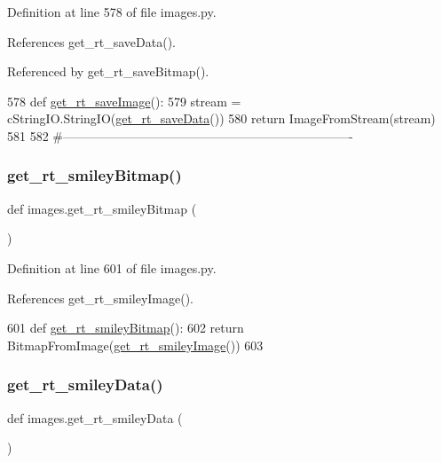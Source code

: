 Definition at line 578 of file images.\+py.



References get\+\_\+rt\+\_\+save\+Data().



Referenced by get\+\_\+rt\+\_\+save\+Bitmap().


\begin{DoxyCode}
578 \textcolor{keyword}{def }\hyperlink{namespaceimages_ac74de0ec00f14235b98b1398783e6f5f}{get\_rt\_saveImage}():
579     stream = cStringIO.StringIO(\hyperlink{namespaceimages_ab57eaafe3165ec3e04e68b392b4e32af}{get\_rt\_saveData}())
580     \textcolor{keywordflow}{return} ImageFromStream(stream)
581 
582 \textcolor{comment}{#----------------------------------------------------------------------}
\end{DoxyCode}
\mbox{\label{namespaceimages_ac352cdc1b61543c7ee9b2b9b8819c34c}} 
\subsubsection{\texorpdfstring{get\+\_\+rt\+\_\+smiley\+Bitmap()}{get\_rt\_smileyBitmap()}}
{\footnotesize\ttfamily def images.\+get\+\_\+rt\+\_\+smiley\+Bitmap (\begin{DoxyParamCaption}{ }\end{DoxyParamCaption})}



Definition at line 601 of file images.\+py.



References get\+\_\+rt\+\_\+smiley\+Image().


\begin{DoxyCode}
601 \textcolor{keyword}{def }\hyperlink{namespaceimages_ac352cdc1b61543c7ee9b2b9b8819c34c}{get\_rt\_smileyBitmap}():
602     \textcolor{keywordflow}{return} BitmapFromImage(\hyperlink{namespaceimages_a80f5f18c45716de64354e8a3cd06e245}{get\_rt\_smileyImage}())
603 
\end{DoxyCode}
\mbox{\label{namespaceimages_ab452e2b655beaf7b1c1f5d07e28913ad}} 
\subsubsection{\texorpdfstring{get\+\_\+rt\+\_\+smiley\+Data()}{get\_rt\_smileyData()}}
{\footnotesize\ttfamily def images.\+get\+\_\+rt\+\_\+smiley\+Data (\begin{DoxyParamCaption}{ }\end{DoxyParamCaption})}



